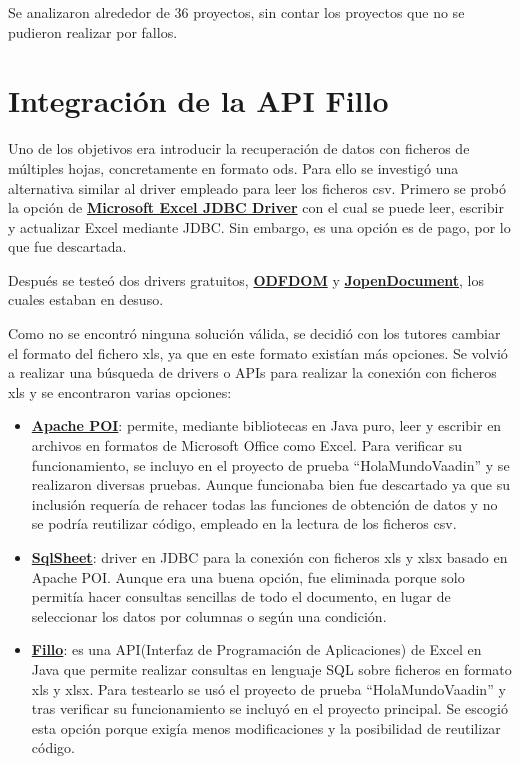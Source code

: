 Se analizaron alrededor de 36 proyectos, sin contar los proyectos que no se pudieron realizar por fallos.

\section{Integración de la API Fillo}
Uno de los objetivos era introducir la recuperación de datos con ficheros de múltiples hojas, concretamente en formato ods.
Para ello se investigó una alternativa similar al driver empleado para leer los ficheros csv. Primero se probó la opción de \textbf{\href{https://www.cdata.com/drivers/excel/jdbc/}{Microsoft Excel JDBC Driver}} con el cual se puede leer, escribir y actualizar Excel mediante JDBC. Sin embargo, es una opción es de pago, por lo que fue descartada. 

Después se testeó dos drivers gratuitos, \textbf{\href{https://odftoolkit.org/}{ODFDOM}} y \textbf{\href{http://www.jopendocument.org/}{JopenDocument}}, los cuales estaban en desuso.

Como no se encontró ninguna solución válida, se decidió con los tutores cambiar el formato del fichero xls, ya que en este formato existían más opciones. Se volvió a realizar una búsqueda de drivers o APIs para realizar la conexión con ficheros xls y se encontraron varias opciones: 
\begin{itemize}
	\item \textbf{\href{https://poi.apache.org/}{Apache POI}}: permite, mediante bibliotecas en Java puro, leer y escribir en archivos en formatos de Microsoft Office como Excel. Para verificar su funcionamiento, se incluyo en el proyecto de prueba ``HolaMundoVaadin'' y se realizaron diversas pruebas. Aunque funcionaba bien fue descartado ya que su inclusión requería de rehacer todas las funciones de obtención de datos y no se podría reutilizar código, empleado en la lectura de los ficheros csv.
	\item \textbf{\href{https://code.google.com/archive/p/sqlsheet/}{SqlSheet}}: driver en JDBC para la conexión con ficheros xls y xlsx basado en Apache POI. Aunque era una buena opción, fue eliminada porque solo permitía hacer consultas sencillas de todo el documento, en lugar de seleccionar los datos por columnas o según una condición. 
	\item \textbf{\href{https://codoid.com/fillo/}{Fillo}}: es una API(Interfaz de Programación de Aplicaciones) de Excel en Java que permite realizar consultas en lenguaje SQL sobre ficheros en formato xls y xlsx. Para testearlo se usó el proyecto de prueba ``HolaMundoVaadin'' y tras verificar su funcionamiento se incluyó en el proyecto principal. Se escogió esta opción porque exigía menos modificaciones y la posibilidad de reutilizar código.
\end{itemize}

